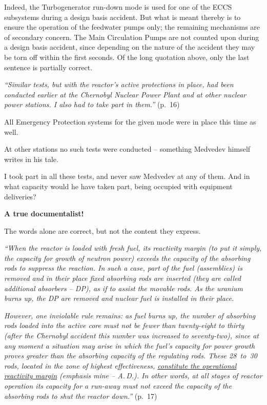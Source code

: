 \documentclass[openright]{bookest}
\begin{document}
Indeed, the Turbogenerator run-down mode is used for one of the ECCS subsystems during a design basis accident. But what is meant thereby is to ensure the operation of the feedwater pumps only; the remaining mechanisms are of secondary concern. The Main Circulation Pumps are not counted upon during a design basis accident, since depending on the nature of the accident they may be torn off within the first seconds. Of the long quotation above, only the last sentence is partially correct.

\begin{personal}
\textit{``Similar tests, but with the reactor's active protections in place, had been conducted earlier at the Chernobyl Nuclear Power Plant and at other nuclear power stations. I also had to take part in them.''} (p.~16)
\end{personal}

All Emergency Protection systems for the given mode were in place this time as well.

At other stations no such tests were conducted -- something Medvedev himself writes in his tale.

I took part in all these tests, and never saw Medvedev at any of them. And in what capacity would he have taken part, being occupied with equipment deliveries?

\bigskip
\textbf{A true documentalist!}

The words alone are correct, but not the content they express.

\begin{personal}
\textit{``When the reactor is loaded with fresh fuel, its reactivity margin (to put it simply, the capacity for growth of neutron power) exceeds the capacity of the absorbing rods to suppress the reaction. In such a case, part of the fuel (assemblies) is removed and in their place fixed absorbing rods are inserted (they are called additional absorbers -- DP), as if to assist the movable rods. As the uranium burns up, the DP are removed and nuclear fuel is installed in their place.}

\textit{However, one inviolable rule remains: as fuel burns up, the number of absorbing rods loaded into the active core must not be fewer than twenty-eight to thirty (after the Chernobyl accident this number was increased to seventy-two), since at any moment a situation may arise in which the fuel's capacity for power growth proves greater than the absorbing capacity of the regulating rods. These \num{28}~to~\num{30} rods, located in the zone of highest effectiveness, \ul{constitute the operational reactivity margin} (emphasis mine -- A.\,D.). In other words, at all stages of reactor operation its capacity for a run-away must not exceed the capacity of the absorbing rods to shut the reactor down.''} (p.~17)
\end{personal}
\end{document}
